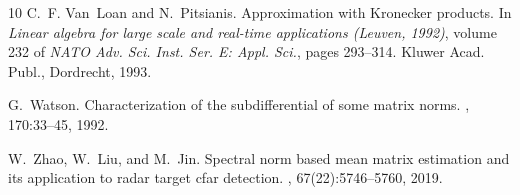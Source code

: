 \documentclass[11pt,reqno]{amsart}
\theoremstyle{definition}
\numberwithin{equation}{section}
\begin{document}
\begin{thebibliography}{10}
C.~F. Van~Loan and N.~Pitsianis.
\newblock Approximation with {K}ronecker products.
\newblock In {\em Linear algebra for large scale and real-time applications
  ({L}euven, 1992)}, volume 232 of {\em NATO Adv. Sci. Inst. Ser. E: Appl.
  Sci.}, pages 293--314. Kluwer Acad. Publ., Dordrecht, 1993.

G.~Watson.
\newblock Characterization of the subdifferential of some matrix norms.
, 170:33--45, 1992.

W.~Zhao, W.~Liu, and M.~Jin.
\newblock Spectral norm based mean matrix estimation and its application to
  radar target cfar detection.
, 67(22):5746--5760,
  2019.

\end{thebibliography}
\end{document}
